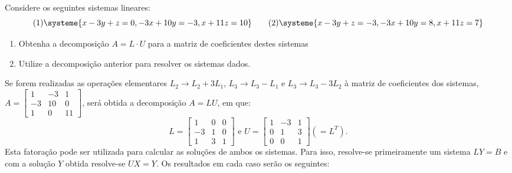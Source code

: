\documentclass[12pt,a4paper]{article}
\begin{document}
\begin{ExerciseList}
\Exercise[title={2,0}]
Considere os seguintes sistemas lineares:
\[
(1)
\systeme{
x-3y+z=0,
-3x+10y=-3,
x+11z=10
}
\qquad
(2)
\systeme{
x-3y+z=-3,
-3x+10y=8,
x+11z=7
}
\]
\begin{enumerate}
\item Obtenha a decomposição $A = L \cdot U$ para a matriz de coeficientes destes sistemas
\item Utilize a decomposição anterior para resolver os sistemas dados.\vspace{-0.6cm}
\end{enumerate}
\Answer
Se forem realizadas as operações elementares $L_2 \to L_2 + 3L_1$, $L_3 \to L_3 - L_1$ e $L_3 \to L_3 - 3L_2$ à matriz de coeficientes dos sistemas, $A=
\begin{bmatrix}
 1 & -3 &  1\\
-3 & 10 &  0\\
 1 &  0 & 11
\end{bmatrix}$, será obtida a decomposição $A = L U$, em que:
\[
L=
\begin{bmatrix}
 1 & 0 &  0\\
-3 & 1 &  0\\
 1 & 3 &  1
\end{bmatrix}
\text{ e }
U =\begin{bmatrix}
1 & -3 & 1\\
0 &  1 & 3\\
0 &  0 & 1
\end{bmatrix} (= L^T).
\]
Esta fatoração pode ser utilizada para calcular as soluções de ambos os sistemas. Para isso, resolve-se primeiramente um sistema $LY=B$ e com a solução $Y$ obtida resolve-se $UX = Y$. Os resultados em cada caso serão os seguintes:
\begin{multicols}{2}
\end{multicols}
\end{ExerciseList}
\end{document}
